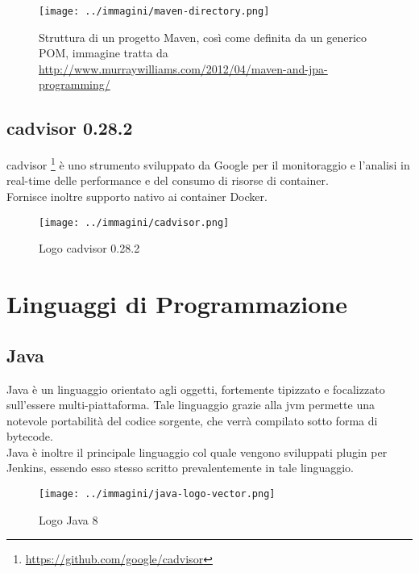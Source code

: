 \begin{figure}[H]
    \capstart
    \centering
    \texttt{[image: ../immagini/maven-directory.png]}
    \caption{Struttura di un progetto Maven, così come definita da un generico POM, immagine tratta da \url{http://www.murraywilliams.com/2012/04/maven-and-jpa-programming/}}
\end{figure}

\subsection{cadvisor 0.28.2}

cadvisor \footnote{\url{https://github.com/google/cadvisor}} è uno strumento sviluppato da Google per il monitoraggio e l'analisi in real-time delle performance e del consumo di risorse di \gls{container}. \\
Fornisce inoltre supporto nativo ai \gls{container} Docker.

\begin{figure}[H]
    \capstart
    \centering
    \texttt{[image: ../immagini/cadvisor.png]}
    \caption{Logo cadvisor 0.28.2}
\end{figure}

\section{Linguaggi di Programmazione}
\subsection{Java}

Java è un linguaggio orientato agli oggetti, fortemente tipizzato e focalizzato sull'essere multi-piattaforma. Tale linguaggio grazie alla \gls{jvm} permette una notevole portabilità del codice sorgente, che verrà compilato sotto forma di \gls{bytecode}. \\

Java è inoltre il principale linguaggio col quale vengono sviluppati \gls{plugin} per Jenkins, essendo esso stesso scritto prevalentemente in tale linguaggio.

\begin{figure}[H]
    \capstart
    \centering
    \texttt{[image: ../immagini/java-logo-vector.png]}
    \caption{Logo Java 8}
\end{figure}

